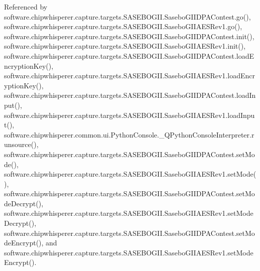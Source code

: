 Referenced by software.\+chipwhisperer.\+capture.\+targets.\+S\+A\+S\+E\+B\+O\+G\+I\+I.\+Sasebo\+G\+I\+I\+D\+P\+A\+Contest.\+go(), software.\+chipwhisperer.\+capture.\+targets.\+S\+A\+S\+E\+B\+O\+G\+I\+I.\+Sasebo\+G\+I\+I\+A\+E\+S\+Rev1.\+go(), software.\+chipwhisperer.\+capture.\+targets.\+S\+A\+S\+E\+B\+O\+G\+I\+I.\+Sasebo\+G\+I\+I\+D\+P\+A\+Contest.\+init(), software.\+chipwhisperer.\+capture.\+targets.\+S\+A\+S\+E\+B\+O\+G\+I\+I.\+Sasebo\+G\+I\+I\+A\+E\+S\+Rev1.\+init(), software.\+chipwhisperer.\+capture.\+targets.\+S\+A\+S\+E\+B\+O\+G\+I\+I.\+Sasebo\+G\+I\+I\+D\+P\+A\+Contest.\+load\+Encryption\+Key(), software.\+chipwhisperer.\+capture.\+targets.\+S\+A\+S\+E\+B\+O\+G\+I\+I.\+Sasebo\+G\+I\+I\+A\+E\+S\+Rev1.\+load\+Encryption\+Key(), software.\+chipwhisperer.\+capture.\+targets.\+S\+A\+S\+E\+B\+O\+G\+I\+I.\+Sasebo\+G\+I\+I\+D\+P\+A\+Contest.\+load\+Input(), software.\+chipwhisperer.\+capture.\+targets.\+S\+A\+S\+E\+B\+O\+G\+I\+I.\+Sasebo\+G\+I\+I\+A\+E\+S\+Rev1.\+load\+Input(), software.\+chipwhisperer.\+common.\+ui.\+Python\+Console.\+\_\+\+Q\+Python\+Console\+Interpreter.\+runsource(), software.\+chipwhisperer.\+capture.\+targets.\+S\+A\+S\+E\+B\+O\+G\+I\+I.\+Sasebo\+G\+I\+I\+D\+P\+A\+Contest.\+set\+Mode(), software.\+chipwhisperer.\+capture.\+targets.\+S\+A\+S\+E\+B\+O\+G\+I\+I.\+Sasebo\+G\+I\+I\+A\+E\+S\+Rev1.\+set\+Mode(), software.\+chipwhisperer.\+capture.\+targets.\+S\+A\+S\+E\+B\+O\+G\+I\+I.\+Sasebo\+G\+I\+I\+D\+P\+A\+Contest.\+set\+Mode\+Decrypt(), software.\+chipwhisperer.\+capture.\+targets.\+S\+A\+S\+E\+B\+O\+G\+I\+I.\+Sasebo\+G\+I\+I\+A\+E\+S\+Rev1.\+set\+Mode\+Decrypt(), software.\+chipwhisperer.\+capture.\+targets.\+S\+A\+S\+E\+B\+O\+G\+I\+I.\+Sasebo\+G\+I\+I\+D\+P\+A\+Contest.\+set\+Mode\+Encrypt(), and software.\+chipwhisperer.\+capture.\+targets.\+S\+A\+S\+E\+B\+O\+G\+I\+I.\+Sasebo\+G\+I\+I\+A\+E\+S\+Rev1.\+set\+Mode\+Encrypt().




